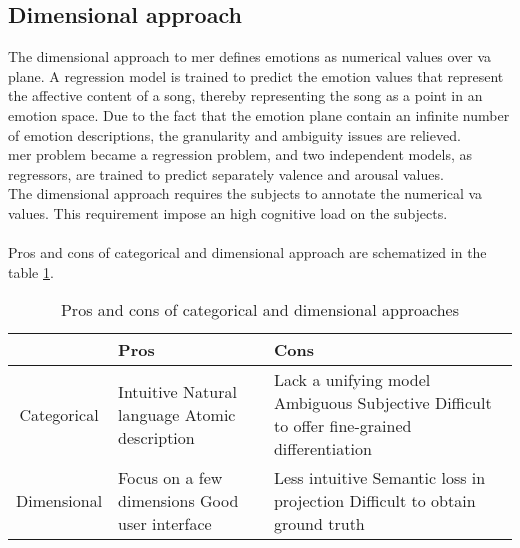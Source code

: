 \subsection{Dimensional approach}
The dimensional approach to \gls{mer} defines emotions as numerical values over \gls{va} plane. A regression model is trained to predict the emotion values that represent the affective content of a song, thereby representing the song as a point in an emotion space. Due to the fact that the emotion plane contain an infinite number of emotion descriptions, the granularity and ambiguity issues are relieved.
\\
\gls{mer} problem became a regression problem, and two independent models, as regressors, are trained to predict separately valence and arousal values.
\\
The dimensional approach requires the subjects to annotate the numerical \gls{va} values. This requirement impose an high cognitive load on the subjects.
\\ \\
Pros and cons of categorical and dimensional approach are schematized in the table \ref{table:pros_cons_categorical_dimensional}.
\begin{table}[h!]
	\centering
	\begin{tabular}{|c|p{}|p{}|}
	\hline
	& Pros & Cons\\ [0.5ex] 
	\hline\hline Categorical & Intuitive \newline Natural language \newline Atomic description & Lack a unifying model \newline Ambiguous \newline Subjective \newline Difficult to offer fine-grained differentiation \\
	\hline Dimensional & Focus on a few dimensions \newline Good user interface & Less intuitive \newline Semantic loss in projection \newline Difficult to obtain ground truth \\
	\hline
	\end{tabular}
	\caption{Pros and cons of categorical and dimensional approaches}
	\label{table:pros_cons_categorical_dimensional}
\end{table}

